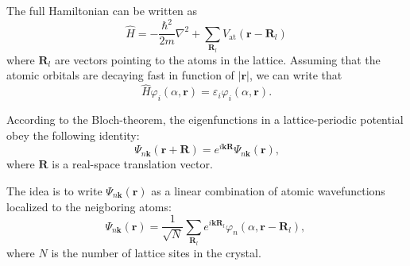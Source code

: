 \documentclass[11pt, a4paper, twocolumn]{article}
\newcommand{\bb}[1]{\mathbf{#1}}
\begin{document}
The full Hamiltonian can be written as
\begin{equation*}
  \hat H = -\frac{\hbar^2}{2m} \nabla^2 + \sum\limits_{\bb{R}_l} V_{\textrm{at}} (\bb r - \bb{R}_l)
\end{equation*}
where $\bb{R}_l$ are vectors pointing to the atoms in the lattice. Assuming that the atomic orbitals are
decaying fast in function of $|\bb r|$, we can write that 
\begin{equation*}
  \hat H \varphi_i(\alpha, \bb r) = \varepsilon_i \varphi_i(\alpha, \bb r) \textrm{.}
\end{equation*}

\par According to the Bloch-theorem, the eigenfunctions in a lattice-periodic potential obey the following identity:
\begin{equation*}
  \Psi_{n\bb k}(\bb r + \bb R) = e^{i\bb k \bb R}\Psi_{n\bb k}(\bb r) \text{,}
\end{equation*}
where $\bb R$ is a real-space translation vector. 
\par The idea is to write $\Psi_{n\bb k}(\bb r)$ as a linear combination of atomic wavefunctions localized to the neigboring atoms:
\begin{equation*}
  \Psi_{n\bb k}(\bb r) = \frac{1}{\sqrt N} \sum\limits_{\bb R_l} e^{i\bb k \bb R_l}\varphi_n(\alpha, \bb r - \bb R_l) \textrm{, }
\end{equation*}
where $N$ is the number of lattice sites in the crystal.
\end{document}
